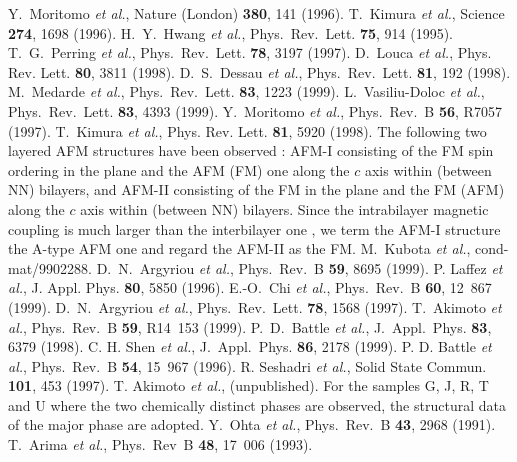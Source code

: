 \begin{references}
Y.~Moritomo {\it et al.},
Nature (London) {\bf 380}, 141 (1996).
T.~Kimura {\it et al.},
Science {\bf 274}, 1698 (1996).
H.~Y.~Hwang {\it et al.},
Phys.\ Rev.\ Lett. {\bf 75}, 914 (1995).
T.~G.~Perring {\it et al.},
Phys.~Rev.~Lett. {\bf 78}, 3197 (1997).
D.~Louca {\it et al.},
Phys. Rev. Lett. {\bf 80}, 3811 (1998).
D.~S.~Dessau {\it et al.},
Phys.~Rev.~Lett. {\bf 81}, 192 (1998).
M.~Medarde {\it et al.},
Phys.\ Rev.\ Lett. {\bf 83}, 1223 (1999).
L.~Vasiliu-Doloc {\it et al.},
Phys.\ Rev.\ Lett. {\bf 83}, 4393 (1999).
Y.~Moritomo {\it et al.},
Phys.~Rev.~B {\bf 56}, R7057 (1997).
T.~Kimura {\it et al.},
Phys. Rev. Lett. {\bf 81}, 5920 (1998).
The following two layered AFM structures have been observed \protect\cite{kubota,argyriou99}:
AFM-I consisting of the FM spin ordering in the plane and the AFM (FM) one along the $c$ axis
within (between NN) bilayers,
and
AFM-II consisting of the FM in the plane and the FM (AFM) along the $c$ axis within (between NN) bilayers.
Since the intrabilayer magnetic coupling is much larger than the interbilayer one \cite{fujioka},
we term the AFM-I structure the A-type AFM one and
regard the AFM-II as the FM.
M.~Kubota {\it et al.},
cond-mat/9902288.
D.~N.~Argyriou {\it et al.},
Phys.~Rev.~B {\bf 59}, 8695 (1999).
P. Laffez {\it et al.},
J. Appl. Phys. {\bf 80}, 5850 (1996).
E.-O.~Chi {\it et al.},
Phys.~Rev.~B {\bf 60}, 12~867 (1999).
D.~N.~Argyriou {\it et al.},
Phys.\ Rev.\ Lett. {\bf 78}, 1568 (1997).
T.~Akimoto {\it et al.},
Phys.\ Rev.\ B {\bf 59}, R14~153 (1999).
P.~D.~Battle {\it et al.},
J.~Appl.~Phys. {\bf 83}, 6379 (1998).
C. H. Shen {\it et al.},
J.~Appl.~Phys. {\bf 86}, 2178 (1999).
P. D. Battle {\it et al.},
Phys.\ Rev.\ B {\bf 54}, 15~967 (1996).
R. Seshadri {\it et al.},
Solid State Commun. {\bf 101}, 453 (1997).
T. Akimoto {\it et al.},
(unpublished).
For the samples G, J, R, T and U
where the two chemically distinct phases are observed,
the structural data of the major phase are adopted.
Y.~Ohta {\it et al.},
Phys.\ Rev.\ B {\bf 43}, 2968 (1991).
T.~Arima {\it et al.},
Phys.~Rev~B {\bf 48}, 17~006 (1993).

\end{references}
